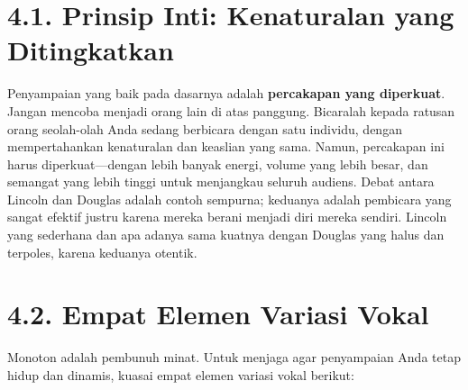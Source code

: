 \documentclass[
  letterpaper,
  DIV=11,
  numbers=noendperiod]{scrreprt}
\begin{document}
\section{\texorpdfstring{\textbf{4.1. Prinsip Inti: Kenaturalan yang
Ditingkatkan}}{4.1. Prinsip Inti: Kenaturalan yang Ditingkatkan}}\label{prinsip-inti-kenaturalan-yang-ditingkatkan}

Penyampaian yang baik pada dasarnya adalah \textbf{percakapan yang
diperkuat}. Jangan mencoba menjadi orang lain di atas panggung.
Bicaralah kepada ratusan orang seolah-olah Anda sedang berbicara dengan
satu individu, dengan mempertahankan kenaturalan dan keaslian yang sama.
Namun, percakapan ini harus diperkuat---dengan lebih banyak energi,
volume yang lebih besar, dan semangat yang lebih tinggi untuk menjangkau
seluruh audiens. Debat antara Lincoln dan Douglas adalah contoh
sempurna; keduanya adalah pembicara yang sangat efektif justru karena
mereka berani menjadi diri mereka sendiri. Lincoln yang sederhana dan
apa adanya sama kuatnya dengan Douglas yang halus dan terpoles, karena
keduanya otentik.

\section{\texorpdfstring{\textbf{4.2. Empat Elemen Variasi
Vokal}}{4.2. Empat Elemen Variasi Vokal}}\label{empat-elemen-variasi-vokal}

Monoton adalah pembunuh minat. Untuk menjaga agar penyampaian Anda tetap
hidup dan dinamis, kuasai empat elemen variasi vokal berikut:
\end{document}
